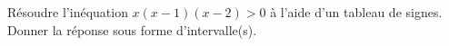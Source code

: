 
\begin{exercice}\label{exoPremiere-0024}

    Résoudre l'inéquation \( x(x-1)(x-2)>0\) à l'aide d'un tableau de signes. Donner la réponse sous forme d'intervalle(s).
 
\end{exercice}
